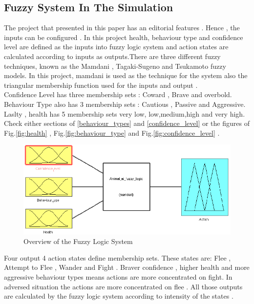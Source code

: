 \subsection{Fuzzy System In The Simulation}

The project that presented in this paper has an editorial features . Hence , the inputs  can be configured . In this project health, behaviour type and confidence level are defined as the inputs into fuzzy logic system  and action states are calculated according to inputs as outputs.There are three different fuzzy techniques, known as the Mamdani \cite{:/content/journals/10.1049/piee.1974.0328}, Tagaki-Sugeno \cite{SUGENO198815} and Tsukamoto \cite{tsukamoto} fuzzy models. In this project, mamdani is used as the technique for the system also the triangular membership function used for the inputs and output .\\

Confidence Level has three membership sets : Coward , Brave and overbold. Behaviour Type also has 3 membership sets : Cautious , Passive and Aggressive. Laslty , health has 5 membership sets very low, low,medium,high and very high. Check either sections of \ref{behaviour_types} and \ref{confidence_level} or the figures of Fig.\ref{fig:health} , Fig.\ref{fig:behaviour_type} and Fig.\ref{fig:confidence_level} .\\






\begin{figure}[ht]
    \centering
    \includegraphics[scale=.53]{Images/overview.png}
    \caption{Overview of the Fuzzy Logic System}
    \label{fig:overview}
\end{figure}

Four output 4 action states define membership sets. These states are: Flee , Attempt to Flee , Wander and Fight  . Braver confidence  , higher health and more aggressive behaviour types means actions are more concentrated on fight. In adversed situation the actions are more concentrated on flee . All those outputs are calculated by the fuzzy logic system according to intensity of the states .

